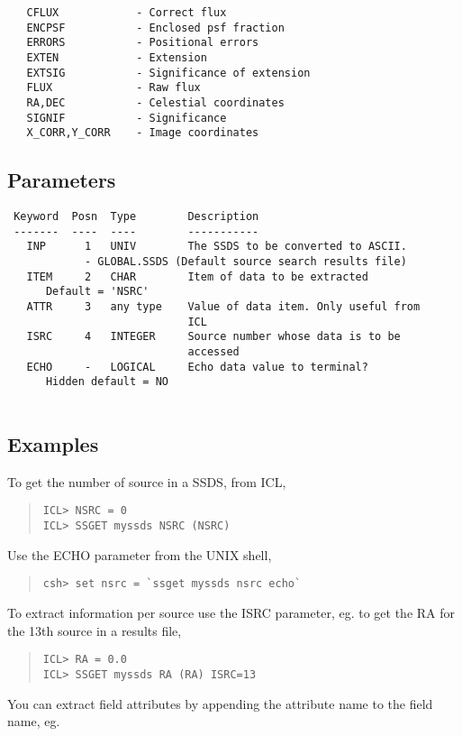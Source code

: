 \documentclass{book}
\renewcommand{\_}{{\tt\char'137}}     %
\begin{document}
\begin{verbatim}
   CFLUX            - Correct flux
   ENCPSF           - Enclosed psf fraction
   ERRORS           - Positional errors
   EXTEN            - Extension
   EXTSIG           - Significance of extension
   FLUX             - Raw flux
   RA,DEC           - Celestial coordinates
   SIGNIF           - Significance
   X_CORR,Y_CORR    - Image coordinates
\end{verbatim}
\subsection{Parameters}
\begin{verbatim}
 Keyword  Posn  Type        Description
 -------  ----  ----        -----------
   INP      1   UNIV        The SSDS to be converted to ASCII.
            - GLOBAL.SSDS (Default source search results file)
   ITEM     2   CHAR        Item of data to be extracted
      Default = 'NSRC'
   ATTR     3   any type    Value of data item. Only useful from
                            ICL
   ISRC     4   INTEGER     Source number whose data is to be
                            accessed
   ECHO     -   LOGICAL     Echo data value to terminal?
      Hidden default = NO
 
\end{verbatim}\subsection{Examples}
To get the number of source in a SSDS, from ICL,
 
\begin{quote}\begin{verbatim}
ICL> NSRC = 0
ICL> SSGET myssds NSRC (NSRC)
\end{verbatim}\end{quote}
Use the ECHO parameter from the UNIX shell,
 
\begin{quote}\begin{verbatim}
csh> set nsrc = `ssget myssds nsrc echo`
\end{verbatim}\end{quote}
To extract information per source use the ISRC parameter, eg. to
get the RA for the 13th source in a results file,
 
\begin{quote}\begin{verbatim}
ICL> RA = 0.0
ICL> SSGET myssds RA (RA) ISRC=13
\end{verbatim}\end{quote}
You can extract field attributes by appending the attribute name to
the field name, eg.
 
\end{document}
